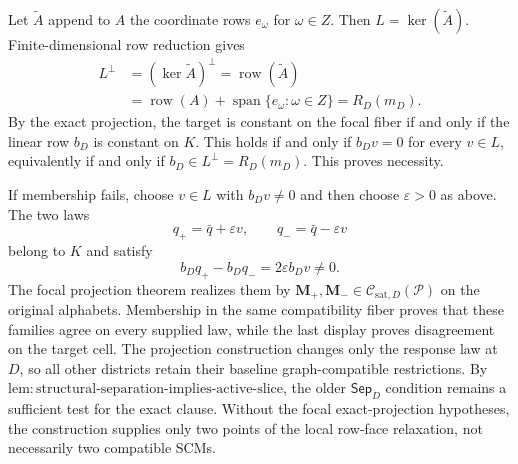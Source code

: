 Let \(\widetilde A\) append to \(A\) the coordinate rows \(e_\omega\) for \(\omega\in Z\).  Then \(L=\ker(\widetilde A)\).  Finite-dimensional row reduction gives
\[
\begin{aligned}
L^\perp
&=(\ker\widetilde A)^\perp
=\operatorname{row}(\widetilde A)\\
&=\operatorname{row}(A)+
\operatorname{span}\{e_\omega:\omega\in Z\}
=R_D(m_D).
\end{aligned}
\]
By the exact projection, the target is constant on the focal fiber if and only if the linear row \(b_D\) is constant on \(K\).  This holds if and only if \(b_Dv=0\) for every \(v\in L\), equivalently if and only if \(b_D\in L^\perp=R_D(m_D)\).  This proves necessity.

If membership fails, choose \(v\in L\) with \(b_Dv\ne0\) and then choose \(\varepsilon>0\) as above.  The two laws
\[
q_+=\bar q+\varepsilon v,
\qquad q_-=\bar q-\varepsilon v
\]
belong to \(K\) and satisfy
\[
b_Dq_+-b_Dq_-=2\varepsilon b_Dv\ne0.
\]
The focal projection theorem realizes them by \(\mathbf M_+,\mathbf M_-\in\mathcal C_{\mathrm{sat},D}(\mathcal P)\) on the original alphabets.  Membership in the same compatibility fiber proves that these families agree on every supplied law, while the last display proves disagreement on the target cell.  The projection construction changes only the response law at \(D\), so all other districts retain their baseline graph-compatible restrictions.  By \(\mathrm{lem:structural\text{-}separation\text{-}implies\text{-}active\text{-}slice}\), the older \(\mathsf{Sep}_D\) condition remains a sufficient test for the exact clause.  Without the focal exact-projection hypotheses, the construction supplies only two points of the local row-face relaxation, not necessarily two compatible SCMs.